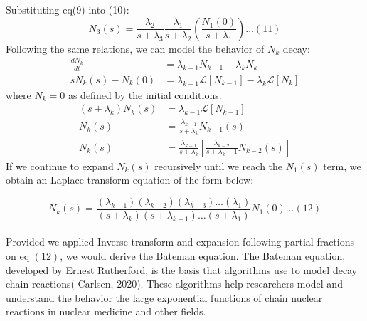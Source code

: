 \documentclass[12pt]{article}
\theoremstyle{plain}
\theoremstyle{definition}
\begin{document}
Substituting eq(9) into (10):\\
\begin{equation*}
N_3(s) = \frac{\lambda_2}{s+\lambda_3} \frac{ \lambda_1}{s+\lambda_2} \left(\frac{N_1(0)}{s+\lambda_1}\right) \dots (11)
\end{equation*}
Following the same relations, we can model the behavior of $N_k $ decay:\\
\begin{align*}
\frac{dN_k}{dt} &= \lambda_{k-1}N_{k-1} - \lambda_k N_k\\
sN_k(s) - N_k(0)&= \lambda_{k-1} \mathcal{L} [N_{k-1}] - \lambda_k \mathcal{L} [N_k] 
\end{align*} 
where $N_k = 0$ as defined by the initial conditions.
\begin{align*}
(s + \lambda_k)N_k(s) &= \lambda_{k-1} \mathcal{L} [N_{k-1}]\\
N_k(s)&= \frac{\lambda_{k-1}}{s + \lambda_k}N_{k-1}(s)\\
N_k(s)&= \frac{\lambda_{k-1}}{s + \lambda_k}\left[\frac{\lambda_{k-2}}{s + \lambda_k-1}N_{k-2}(s)\right]
\end{align*}
If we continue to expand $N_k(s)$ recursively until we reach the $N_1(s)$ term, we obtain an Laplace transform equation of the form below:

\begin{equation*}
N_k(s) = \frac{(\lambda_{k-1}) (\lambda_{k-2}) (\lambda_{k-3}) \dots (\lambda_1)} {(s + \lambda_k)(s + \lambda_{k-1}) \dots (s + \lambda_1)} N_1(0) \dots (12)
\end{equation*}
\\
Provided we applied Inverse transform and expansion following partial fractions on eq $(12)$, we would derive the Bateman equation. The Bateman equation, developed by Ernest Rutherford, is the basis that algorithms use to model decay chain reactions( Carlsen, 2020). These algorithms help researchers model and understand the behavior the large exponential functions of chain nuclear reactions in nuclear medicine and other fields.
\end{document}
